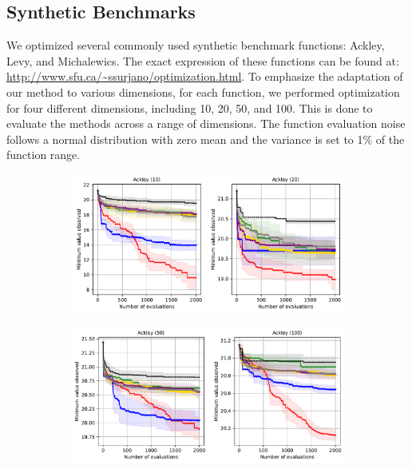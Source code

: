\subsection{Synthetic Benchmarks}
We optimized several commonly used synthetic benchmark functions: Ackley, Levy, and Michalewics. The exact expression of these functions can be found at: \url{http://www.sfu.ca/~ssurjano/optimization.html}. To emphasize the adaptation of our method to various dimensions, for each function, we performed optimization for four different dimensions, including 10, 20, 50, and 100. This is done to evaluate the methods across a range of dimensions. The function evaluation noise follows a normal distribution with zero mean and the variance is set to 1\% of the function range.
\begin{figure}[htbp]
    \centering
    \begin{subfigure}[b]{0.8\textwidth}
        \centering
        \includegraphics[width=\textwidth]{Figures/Neural-BO/A1.pdf}
    \end{subfigure}
    \begin{subfigure}[b]{0.8\textwidth}
        \centering
        \includegraphics[width=\textwidth]{Figures/Neural-BO/A2.pdf}
    \end{subfigure}
    \begin{subfigure}[b]{0.8\textwidth}

\end{subfigure}
\end{figure}
